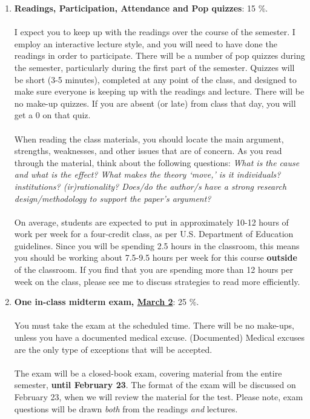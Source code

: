 \documentclass[letterpaper]{article}
\begin{document}
\begin{enumerate}

	\item {\bf Readings, Participation, Attendance and Pop quizzes}: 15 \%.
	\\
	\\
	I expect you to keep up with the readings over the course of the semester. I employ an interactive lecture style, and you will need to have done the readings in order to participate. There will be a number of pop quizzes during the semester, particularly during the first part of the semester.  Quizzes will be short (3-5 minutes), completed at any point of the class, and designed to make sure everyone is keeping up with the readings and lecture. There will be no make-up quizzes. If you are absent (or late) from class that day, you will get a $0$ on that quiz. 
	\\
	\\
	When reading the class materials, you should locate the main argument, strengths, weaknesses, and other issues that are of concern. As you read through the material, think about the following questions: \emph{What is the cause and what is the effect? What makes the theory `move,' is it individuals? institutions? (ir)rationality? Does/do the author/s have a strong research design/methodology to support the paper's argument?} 
	\\
	\\
	On average, students are expected to put in approximately 10-12 hours of work per week for a four-credit class, as per U.S. Department of Education guidelines.  Since you will be spending 2.5 hours in the classroom, this means you should be working about 7.5-9.5 hours per week for this course {\bf outside} of the classroom. If you find that you are spending more than 12 hours per week on the class, please see me to discuss strategies to read more efficiently. 


	\item {\bf One in-class midterm exam, \underline{March 2}}: 25 \%. 
	\\
	\\
	You must take the exam at the scheduled time. There will be no make-ups, unless you have a documented medical excuse. (Documented) Medical excuses are the only type of exceptions that will be accepted.
	\\
	\\
	The exam will be a closed-book exam, covering material from the entire semester, {\bf until February 23}. The format of the exam will be discussed on February 23, when we will review the material for the test. Please note, exam questions will be drawn \emph{both} from the readings \emph{and} lectures.



\end{enumerate}
\end{document}

